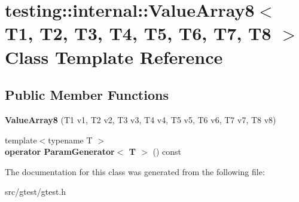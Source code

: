 \hypertarget{classtesting_1_1internal_1_1_value_array8}{}\section{testing\+:\+:internal\+:\+:Value\+Array8$<$ T1, T2, T3, T4, T5, T6, T7, T8 $>$ Class Template Reference}
\label{classtesting_1_1internal_1_1_value_array8}
\subsection*{Public Member Functions}
\begin{DoxyCompactItemize}
\item 
\mbox{\label{classtesting_1_1internal_1_1_value_array8_aa935d771149e26694277b6b9a3f6f5d3}} 
{\bfseries Value\+Array8} (T1 v1, T2 v2, T3 v3, T4 v4, T5 v5, T6 v6, T7 v7, T8 v8)
\item 
\mbox{\label{classtesting_1_1internal_1_1_value_array8_a265f6e8bc6ceede7e673682ddebb82c5}} 
{\footnotesize template$<$typename T $>$ }\\{\bfseries operator Param\+Generator$<$ T $>$} () const
\end{DoxyCompactItemize}


The documentation for this class was generated from the following file\+:\begin{DoxyCompactItemize}
\item 
src/gtest/gtest.\+h\end{DoxyCompactItemize}
